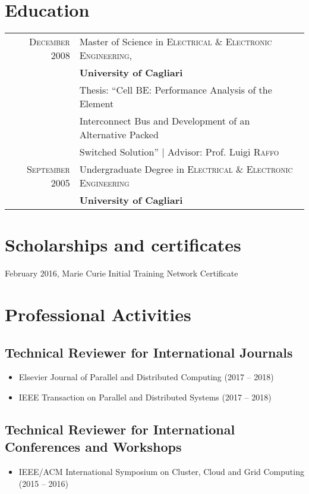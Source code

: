 \documentclass[a4paper,titlepage,oneside,11pt]{book}
\begin{document}
\section*{Education}
\begin{tabular}{rl}
\textsc{December} 2008 & Master of Science in \textsc{Electrical \& Electronic Engineering}, \\
& \textbf{University of Cagliari}\\
& Thesis: ``Cell BE: Performance Analysis of the Element\\
& Interconnect Bus and Development of an Alternative Packed\\
& Switched Solution'' | \small Advisor: Prof. Luigi \textsc{Raffo}\\
\textsc{September} 2005& Undergraduate Degree in \textsc{Electrical \& Electronic Engineering} \\
& \textbf{University of Cagliari}\\
\end{tabular}


\section*{Scholarships and certificates}
February 2016, Marie Curie Initial Training Network Certificate

\section*{Professional Activities}

\subsection*{Technical Reviewer for International Journals}
\begin{itemize}
    \item Elsevier Journal of Parallel and Distributed Computing (2017 -- 2018)
    \item IEEE Transaction on Parallel and Distributed Systems (2017 -- 2018)
\end{itemize}

\subsection*{Technical Reviewer for International Conferences and Workshops}
\begin{itemize}
    \item IEEE/ACM International Symposium on Cluster, Cloud and Grid Computing (2015 -- 2016)
\end{itemize}
\end{document}
